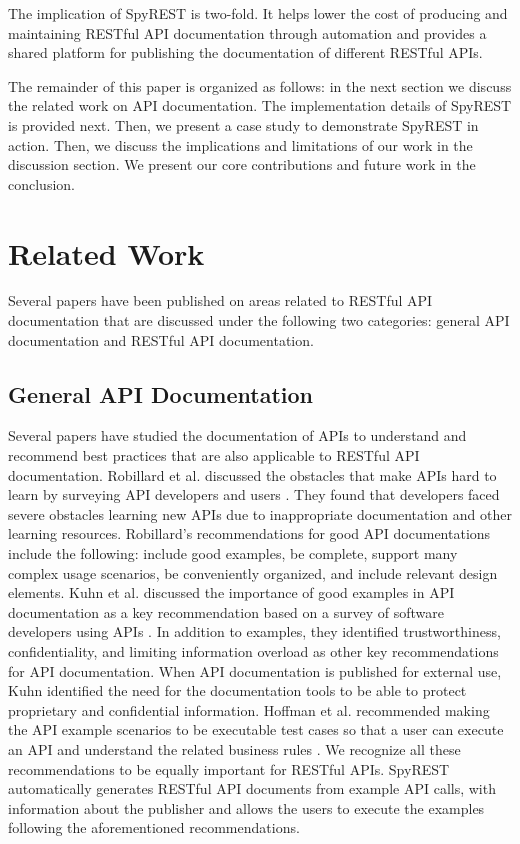 \documentclass[conference]{IEEEtran}
\begin{document}
The implication of SpyREST is two-fold. It helps lower the cost of producing and maintaining RESTful API documentation through automation and provides a shared platform for publishing the documentation of different RESTful APIs.

The remainder of this paper is organized as follows: in the next section we discuss the related work on API documentation. The implementation details of SpyREST is provided next. Then, we present a case study to demonstrate SpyREST in action. Then, we discuss the implications and limitations of our work in the discussion section. We present our core contributions and future work in the conclusion.


\section{Related Work} %
\label{sec:related_work}
Several papers have been published on areas related to RESTful API documentation that are discussed under the following two categories: general API documentation and RESTful API documentation.

\subsection{General API Documentation} %
\label{ssub:api_learnability}
Several papers have studied the documentation of APIs to understand and recommend best practices that are also applicable to RESTful API documentation. Robillard et al. discussed the obstacles that make APIs hard to learn by surveying API developers and users \cite{Robillard_what_makes} \cite{Robillard_a_field_study}. They found that  developers faced severe obstacles learning new APIs due to inappropriate documentation and other learning resources. Robillard's recommendations for good API documentations include the following: include good examples, be complete, support many complex usage scenarios, be conveniently organized, and include relevant design elements. Kuhn et al. discussed the importance of good examples in API documentation as a key recommendation based on a survey of software developers using APIs \cite{Kuhn_on_designing}. In addition to examples, they identified trustworthiness, confidentiality, and limiting information overload as other key recommendations for API documentation. When API documentation is published for external use, Kuhn identified the need for the documentation tools to be able to protect proprietary and confidential information. Hoffman et al. recommended making the API example scenarios to be executable test cases so that a user can execute an API and understand the related business rules \cite{Hoffman_api_documentation}. We recognize all these recommendations to be equally important for RESTful APIs. SpyREST automatically generates RESTful API documents from example API calls, with information about the publisher and allows the users to execute the examples following the aforementioned recommendations.
\end{document}
